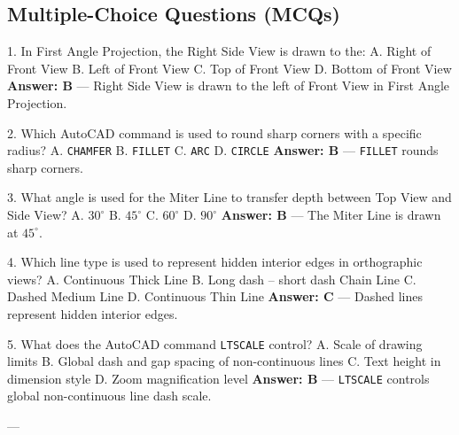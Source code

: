 \subsection{Multiple-Choice Questions (MCQs)}

1. In First Angle Projection, the Right Side View is drawn to the:  
   A. Right of Front View  
   B. Left of Front View  
   C. Top of Front View  
   D. Bottom of Front View  
   \textbf{Answer: B} — Right Side View is drawn to the left of Front View in First Angle Projection.

2. Which AutoCAD command is used to round sharp corners with a specific radius?  
   A. \texttt{CHAMFER}  
   B. \texttt{FILLET}  
   C. \texttt{ARC}  
   D. \texttt{CIRCLE}  
   \textbf{Answer: B} — \texttt{FILLET} rounds sharp corners.

3. What angle is used for the Miter Line to transfer depth between Top View and Side View?  
   A. $30^\circ$  
   B. $45^\circ$  
   C. $60^\circ$  
   D. $90^\circ$  
   \textbf{Answer: B} — The Miter Line is drawn at $45^\circ$.

4. Which line type is used to represent hidden interior edges in orthographic views?  
   A. Continuous Thick Line  
   B. Long dash -- short dash Chain Line  
   C. Dashed Medium Line  
   D. Continuous Thin Line  
   \textbf{Answer: C} — Dashed lines represent hidden interior edges.

5. What does the AutoCAD command \texttt{LTSCALE} control?  
   A. Scale of drawing limits  
   B. Global dash and gap spacing of non-continuous lines  
   C. Text height in dimension style  
   D. Zoom magnification level  
   \textbf{Answer: B} — \texttt{LTSCALE} controls global non-continuous line dash scale.

---

